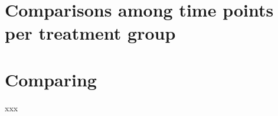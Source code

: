 \documentclass[a4paper]{article}\usepackage[]{graphicx}\usepackage[]{color}
\begin{document}
\section{Comparisons among time points per treatment group}
\label{TPG}

\clearpage


\section{Comparing }
\label{Comp}

xxx
\end{document}
